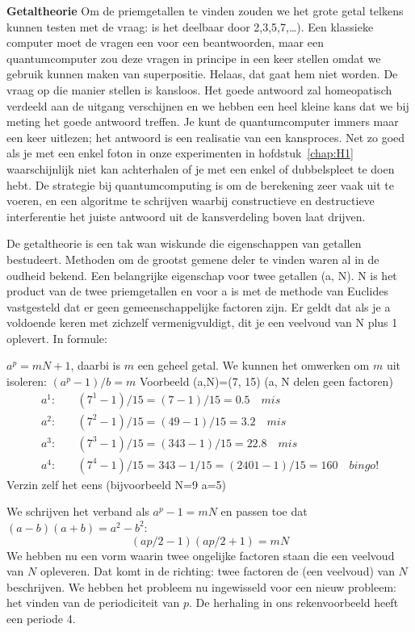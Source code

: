 \documentclass[../main.tex]{subfiles}
\begin{document}
\textbf{Getaltheorie} Om de priemgetallen te vinden zouden we het grote getal telkens kunnen testen met de vraag: is het deelbaar door 2,3,5,7,\ldots). Een klassieke computer moet de vragen een voor een beantwoorden, maar een quantumcomputer zou deze vragen in principe in een keer stellen omdat we gebruik kunnen maken van superpositie. Helaas, dat gaat hem niet worden. De vraag op die manier stellen is kansloos. Het goede antwoord zal homeopatisch verdeeld aan de uitgang verschijnen en we hebben een heel kleine kans dat we bij meting het goede antwoord treffen. Je kunt de quantumcomputer immers maar een keer uitlezen; het antwoord is een realisatie van een kansproces. Net zo goed als je met een enkel foton in onze experimenten in hofdstuk~\ref{chap:H1} waarschijnlijk niet kan achterhalen of je met een enkel of dubbelspleet te doen hebt. De strategie bij quantumcomputing is om de berekening zeer vaak uit te voeren, en een algoritme te schrijven waarbij constructieve en destructieve interferentie het juiste antwoord uit de kansverdeling boven laat drijven. 

De getaltheorie is een tak wan wiskunde die eigenschappen van getallen bestudeert. Methoden om de grootst gemene deler  te vinden waren al in de oudheid bekend. Een belangrijke eigenschap voor twee getallen (a, N). N is het product van de twee priemgetallen en voor a is met de methode van Euclides vastgesteld dat er geen gemeenschappelijke factoren zijn. Er geldt dat als je a voldoende keren met zichzelf vermenigvuldigt, dit je een veelvoud van N plus 1 oplevert. In formule:

$a^p=mN+1$, daarbi is $m$ een geheel getal.
We kunnen het omwerken om $m$ uit isoleren: $(a^p -1)/b=m$
Voorbeeld (a,N)=(7, 15) (a, N delen geen factoren)
\[\begin{aligned}
a^1:\quad &(7^1-1)/15=(7-1)/15=0.5 \quad mis\\
a^2:\quad &(7^2-1)/15=(49-1)/15=3.2 \quad mis\\
a^3:\quad &(7^3-1)/15=(343-1)/15=22.8 \quad mis\\
a^4:\quad &(7^4-1)/15=343-1/15=(2401-1)/15=160 \quad bingo!
\end{aligned}\]
Verzin zelf het eens (bijvoorbeeld N=9 a=5)

We schrijven het verband als  $a^p -1=mN$ en passen toe dat $(a-b)(a+b)=a^2-b^2$:
\[(ap/2-1)(ap/2+1) = mN\]
We hebben nu een vorm waarin twee ongelijke factoren staan die een veelvoud van $N $ opleveren. Dat komt in de richting: twee factoren de (een veelvoud) van $N$ beschrijven. We hebben het probleem nu ingewisseld voor een nieuw probleem: het vinden van de periodiciteit van $p$. De herhaling in ons rekenvoorbeeld heeft een periode 4. 
\end{document}
